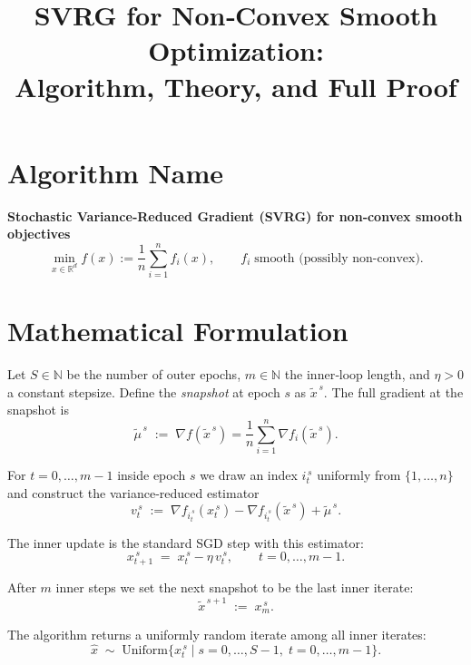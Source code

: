\documentclass{article}
\title{SVRG for Non‑Convex Smooth Optimization:\\ Algorithm, Theory, and Full Proof}
\author{}
\date{}
\newcommand{\R}{\mathbb{R}}
\newcommand{\grad}{\nabla}
\begin{document}
\maketitle

\section*{Algorithm Name}
\textbf{Stochastic Variance‑Reduced Gradient (SVRG) for non‑convex smooth objectives}
\[
\min_{x\in\R^{d}} f(x):=\frac{1}{n}\sum_{i=1}^{n} f_i(x),
\qquad f_i\; \text{smooth (possibly non‑convex)} .
\]

\section*{Mathematical Formulation}
Let $S\in\mathbb N$ be the number of outer epochs, $m\in\mathbb N$ the inner‑loop length, and $\eta>0$ a constant stepsize.  
Define the \emph{snapshot} at epoch $s$ as $\tilde{x}^{\,s}$. The full gradient at the snapshot is
\[
\tilde{\mu}^{\,s}\;:=\;\grad f(\tilde{x}^{\,s})=\frac1n\sum_{i=1}^{n}\grad f_i(\tilde{x}^{\,s}).
\]

For $t=0,\dots,m-1$ inside epoch $s$ we draw an index $i_t^{\,s}$ uniformly from $\{1,\dots,n\}$ and construct the variance‑reduced estimator
\[
v_t^{\,s}\;:=\;\grad f_{i_t^{\,s}}(x_t^{\,s})-\grad f_{i_t^{\,s}}(\tilde{x}^{\,s})+\tilde{\mu}^{\,s}.
\tag{1}
\]

The inner update is the standard SGD step with this estimator:
\[
x_{t+1}^{\,s}\;=\;x_t^{\,s}-\eta\, v_t^{\,s},\qquad t=0,\dots,m-1 .
\tag{2}
\]

After $m$ inner steps we set the next snapshot to be the last inner iterate:
\[
\tilde{x}^{\,s+1}\;:=\;x_m^{\,s}.
\tag{3}
\]

The algorithm returns a uniformly random iterate among all inner iterates:
\[
\widehat{x}\;\sim\;\text{Uniform}\bigl\{x_t^{\,s}\;|\; s=0,\dots,S-1,\;t=0,\dots,m-1\bigr\}.
\]

\end{document}
